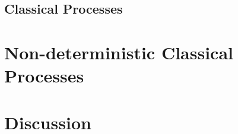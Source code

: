 \documentclass[12pt,a4paper,UKenglish,mscres,logo,twoside,plainprepages,notimes,lfcs]{infthesis}
\begin{document}
\section{Classical Processes}
























\chapter{Non-deterministic Classical Processes}\label{sec:main}

























\chapter{Discussion}\label{sec:discussion}

\printbibliography
\end{document}
